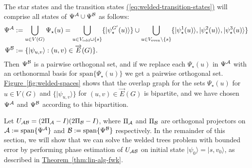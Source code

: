 \documentclass{theoretics}
\newcommand{\eq}[1]{\hyperref[eq:#1]{(\ref*{eq:#1})}}
\newcommand{\thm}[1]{\hyperref[thm:#1]{Theorem~\ref*{thm:#1}}}
\newcommand{\fig}[1]{\hyperref[fig:#1]{Figure~\ref*{fig:#1}}}
\def\ket#1{{\lvert}#1\rangle}
\renewcommand{\>}{\rangle}
\newcommand{\<}{\langle}
\renewcommand{\(}{\left(}
\renewcommand{\)}{\right)}
\begin{document}
The star states  and the transition states \eq{welded-transition-states} will comprise all states of $\Psi^{\cal A}\cup \Psi^{\cal B}$ as follows:
\begin{equation}
\begin{split}
\Psi^{\cal A} &:= \bigcup_{u\in V(G)}\Psi_\star(u)=\bigcup_{u\in V_{\mathrm{odd}}\cup\{s\}}\{\ket{\psi_\star^{G'}(u)}\}\cup\bigcup_{u\in V_{\mathrm{even}}\setminus\{s\}}\{\ket{\psi^1_\star(u)},\ket{\psi^2_\star(u)},\ket{\psi^3_\star(u)}\}\\
\Psi^{\cal B} &:= \{\ket{\psi_{u,v}}:(u,v)\in\overrightarrow{E}(G)\}.
\end{split}\label{eq:welded-Psi}
\end{equation}
Then $\Psi^{\cal B}$ is a pairwise orthogonal set, and if we replace each $\Psi_\star(u)$ in $\Psi^{\cal A}$ with an orthonormal basis for $\mathrm{span}\{\Psi_\star(u)\}$ we get a pairwise orthogonal set. \fig{welded-spaces} shows that the overlap graph for the sets $\Psi_\star(u)$ for $u\in V(G)$ and $\{\ket{\psi_{u,v}}\}$ for $(u,v)\in\overrightarrow{E}(G)$ is bipartite, and we have chosen $\Psi^{\cal A}$ and $\Psi^{\cal B}$ according to this bipartition. 

Let $U_{\cal AB}=(2\Pi_{\cal A}-I)(2\Pi_{\cal B}-I)$, where $\Pi_{\cal A}$ and $\Pi_{\cal B}$ are orthogonal projectors on ${\cal A}:=\mathrm{span}\{\Psi^{\cal A}\}$ and ${\cal B}:=\mathrm{span}\{\Psi^{\cal B}\}$ respectively.
In the remainder of this section, we will show that we can solve the welded trees problem with bounded error by performing phase estimation of $U_{\cal AB}$ on initial state $\ket{\psi_0}=\ket{s,v_0}$, as described in \thm{lin-alg-fwk}. 
\end{document}
